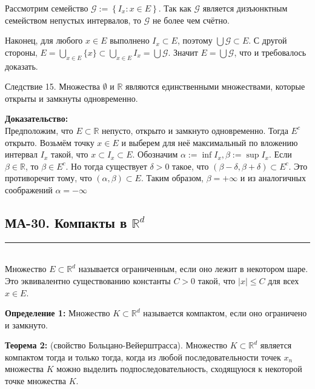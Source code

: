 \documentclass[a4paper,12pt]{article} %
\newcommand{\HRule}{\rule{\linewidth}{0.5mm}}
\begin{document}
Рассмотрим семейство $\mathcal{G}:=\left\{I_{x}: x \in E\right\}$. Так как $\mathcal{G}$ является дизъюнктным семейством непустых интервалов, то $\mathcal{G}$ не более чем счётно.

Наконец, для любого $x \in E$ выполнено $I_{x} \subset E$, поэтому $\bigcup \mathcal{G} \subset E$. С другой стороны, $E=\bigcup_{x \in E}\{x\} \subset \bigcup_{x \in E} I_{x}=\bigcup \mathcal{G}$. Значит $E=\bigcup \mathcal{G}$, что и требовалось доказать.

Следствие 15. Множества $\emptyset$ и $\mathbb{R}$ являются единственными множествами, которые открыты и замкнуты одновременно.

\textbf{Доказательство:}\\
Предположим, что $E \subset \mathbb{R}$ непусто, открыто и замкнуто одновременно. Тогда $E^{c}$ открыто. Возьмём точку $x \in E$ и выберем для неё максимальный по вложению интервал $I_{x}$ такой, что $x \subset I_{x} \subset E$. Обозначим $\alpha:=\inf I_{x}, \beta:=\sup I_{x}$. Если $\beta \in \mathbb{R}$, то $\beta \in E^{c}$. Но тогда существует $\delta>0$ такое, что $(\beta-\delta, \beta+\delta) \subset E^{c}$. Это противоречит тому, что $(\alpha, \beta) \subset E$. Таким образом, $\beta=+\infty$ и из аналогичных соображений $\alpha=-\infty$




\newpage
\begin{LARGE}
  \begin{center}
    \section{МА-30. Компакты в $\mathbb{R}^{d}$ }
  \end{center}
\end{LARGE}
\HRule \\

Множество $E \subset \mathbb{R}^{d}$ называется ограниченным, если оно лежит в некотором шаре. Это эквивалентно существованию константы $C>0$ такой, что $|x| \leq C$ для всех $x \in E$.

\textbf{Определение 1:} Множество $K \subset \mathbb{R}^{d}$ называется компактом, если оно ограничено и замкнуто.

\textbf{Теорема 2:} (свойство Больцано-Вейерштрасса). Множество $K \subset \mathbb{R}^{d}$ является компактом тогда и только тогда, когда из любой последовательности точек $x_{n}$ множества $K$ можно выделить подпоследовательность, сходящуюся к некоторой точке множества $K$.
\end{document}

